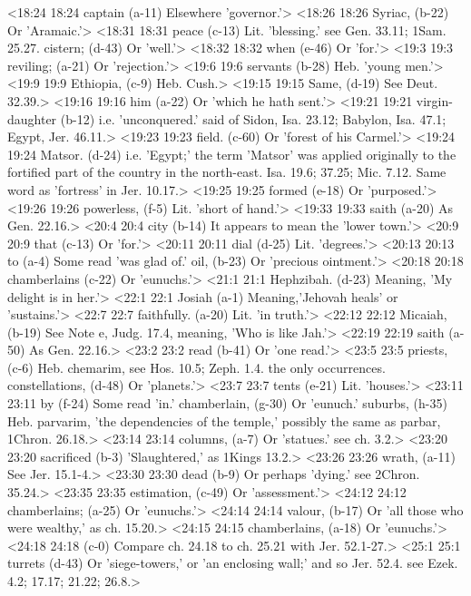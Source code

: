 <18:24 18:24  captain (a-11)  Elsewhere 'governor.'>
<18:26 18:26  Syriac, (b-22)  Or 'Aramaic.'>
<18:31 18:31  peace (c-13)  Lit. 'blessing.' see Gen. 33.11; 1Sam. 25.27.
  cistern; (d-43)  Or 'well.'>
<18:32 18:32  when (e-46)  Or 'for.'>
<19:3 19:3  reviling; (a-21)  Or 'rejection.'>
<19:6 19:6  servants (b-28)  Heb. 'young men.'>
<19:9 19:9  Ethiopia, (c-9)  Heb. Cush.>
<19:15 19:15  Same, (d-19)  See Deut. 32.39.>
<19:16 19:16  him (a-22)  Or 'which he hath sent.'>
<19:21 19:21  virgin-daughter (b-12)  i.e. 'unconquered.' said of Sidon, Isa. 23.12; Babylon, Isa.  47.1; Egypt, Jer. 46.11.>
<19:23 19:23  field. (c-60)  Or 'forest of his Carmel.'>
<19:24 19:24  Matsor. (d-24)  i.e. 'Egypt;' the term 'Matsor' was applied originally to the  fortified part of the country in the north-east. Isa. 19.6;  37.25; Mic. 7.12. Same word as 'fortress' in Jer. 10.17.>
<19:25 19:25  formed (e-18)  Or 'purposed.'>
<19:26 19:26  powerless, (f-5)  Lit. 'short of hand.'>
<19:33 19:33  saith (a-20)  As Gen. 22.16.>
<20:4 20:4  city (b-14)  It appears to mean the 'lower town.'>
<20:9 20:9  that (c-13)  Or 'for.'>
<20:11 20:11  dial (d-25)  Lit. 'degrees.'>
<20:13 20:13  to (a-4)  Some read 'was glad of.'
  oil, (b-23)  Or 'precious ointment.'>
<20:18 20:18  chamberlains (c-22)  Or 'eunuchs.'>
<21:1 21:1  Hephzibah. (d-23)  Meaning, 'My delight is in her.'>
<22:1 22:1  Josiah (a-1)  Meaning,'Jehovah heals' or 'sustains.'>
<22:7 22:7  faithfully. (a-20)  Lit. 'in truth.'>
<22:12 22:12  Micaiah, (b-19)  See Note e, Judg. 17.4, meaning, 'Who is like Jah.'>
<22:19 22:19  saith (a-50)  As Gen. 22.16.>
<23:2 23:2  read (b-41)  Or 'one read.'>
<23:5 23:5  priests, (c-6)  Heb. chemarim, see Hos. 10.5; Zeph. 1.4. the only  occurrences.
  constellations, (d-48)  Or 'planets.'>
<23:7 23:7  tents (e-21)  Lit. 'houses.'>
<23:11 23:11  by (f-24)  Some read 'in.'
  chamberlain, (g-30)  Or 'eunuch.'
  suburbs, (h-35)  Heb. parvarim, 'the dependencies of the temple,' possibly  the same as parbar, 1Chron. 26.18.>
<23:14 23:14  columns, (a-7)  Or 'statues.' see ch. 3.2.>
<23:20 23:20  sacrificed (b-3)  'Slaughtered,' as 1Kings 13.2.>
<23:26 23:26  wrath, (a-11)  See Jer. 15.1-4.>
<23:30 23:30  dead (b-9)  Or perhaps 'dying.' see 2Chron. 35.24.>
<23:35 23:35  estimation, (c-49)  Or 'assessment.'>
<24:12 24:12  chamberlains; (a-25) Or 'eunuchs.'>
<24:14 24:14  valour, (b-17)  Or 'all those who were wealthy,' as ch. 15.20.>
<24:15 24:15  chamberlains, (a-18)  Or 'eunuchs.'>
<24:18 24:18   (c-0)  Compare ch. 24.18 to ch. 25.21 with Jer. 52.1-27.>
<25:1 25:1  turrets (d-43)  Or 'siege-towers,' or 'an enclosing wall;' and so Jer. 52.4.  see Ezek. 4.2; 17.17; 21.22; 26.8.>
